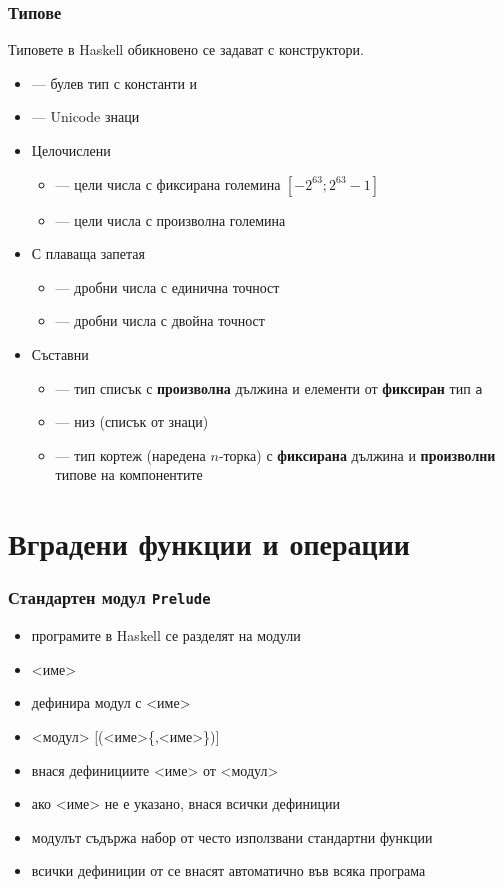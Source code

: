 \documentclass[alsotrans]{beamerswitch}
\begin{document}
\begin{frame}
  \frametitle{Типове}

  Типовете в Haskell обикновено се задават с конструктори. \pause
  \begin{itemize}[<+->]
  \item {} --- булев тип с константи  и 
  \item {} --- Unicode знаци
  \item Целочислени
    \begin{itemize}
    \item {} --- цели числа с фиксирана големина $[-2^{63}; 2^{63}-1]$
    \item {} --- цели числа с произволна големина
    \end{itemize}
  \item С плаваща запетая
    \begin{itemize}
    \item {} --- дробни числа с единична точност
    \item {} --- дробни числа с двойна точност
    \end{itemize}
  \item Съставни
    \begin{itemize}
    \item \lst{[a]} --- тип списък с \textbf{произволна} дължина и
      елементи от \textbf{фиксиран} тип \tt a
    \item {} --- низ (списък от знаци)
    \item {} --- тип кортеж (наредена $n$-торка) с
      \textbf{фиксирана} дължина и \textbf{произволни} типове на
      компонентите
    \end{itemize}
  \end{itemize}
\end{frame}

\section{Вградени функции и операции}

\begin{frame}[fragile]
  \frametitle{Стандартен модул \tt{Prelude}}

  \begin{itemize}[<+->]
  \item програмите в Haskell се разделят на модули
  \item {} <име> 
  \item дефинира модул с <име>
  \item {} <модул> [\tta(<име>\{,<име>\}\tta)]
  \item внася дефинициите <име> от <модул>
  \item ако <име> не е указано, внася всички дефиниции
  \item модулът  съдържа набор от често използвани стандартни функции
  \item всички дефиниции от  се внасят автоматично във всяка програма
  \end{itemize}
\end{frame}
\end{document}
